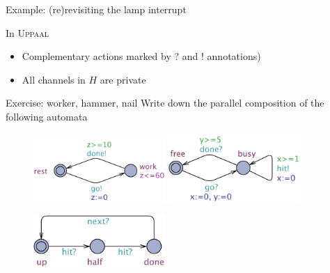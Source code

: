 \documentclass{beamer}
\def\uppaal{\textsc{Uppaal}}
\begin{document}
\begin{slide}{Example: (re)revisiting the lamp interrupt}
\vfill
\begin{block}{In \uppaal}
\begin{itemize}
\item Complementary
  actions marked by \alert{?} and \alert{!} annotations)
\item All channels in $H$ are \alert{private}
\end{itemize}
\end{block}
\end{slide}

\begin{slide}{Exercise: worker, hammer, nail}
        Write down the parallel composition of the following automata

\begin{figure}[htb]
  \includegraphics[width=50mm]{./images/Worker.pdf}
  \hspace{0.5cm}
  \includegraphics[width=50mm]{./images/Hammer.pdf}

  \vspace{0.5cm}
  \includegraphics[width=50mm]{./images/Nail.pdf}
\end{figure}
\end{slide}
\end{document}
